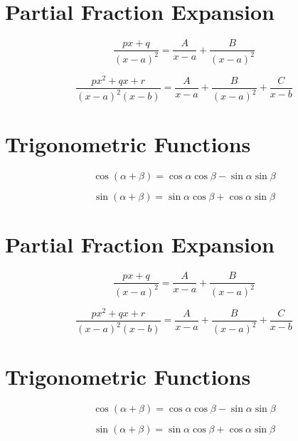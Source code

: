 \documentclass[a4paper,12pt]{article}
\begin{document}
\newpage
\section*{Partial Fraction Expansion}
\begin{equation*}
    \frac{p x + q}{(x - a)^2} = \frac{A}{x - a} + \frac{B}{(x - a)^2}
\end{equation*}

\begin{equation*}
    \frac{p x^2 + q x + r}{(x - a)^2 (x - b)} = \frac{A}{x - a} + \frac{B}{(x - a)^2} + \frac{C}{x - b}
\end{equation*}

\section*{Trigonometric Functions}
\begin{equation*}
    \cos(\alpha + \beta) = \cos \alpha \cos \beta - \sin \alpha \sin \beta
\end{equation*}

\begin{equation*}
    \sin(\alpha + \beta) = \sin \alpha \cos \beta + \cos \alpha \sin \beta
\end{equation*}

\section*{Partial Fraction Expansion}
\begin{equation*}
    \frac{p x + q}{(x - a)^2} = \frac{A}{x - a} + \frac{B}{(x - a)^2}
\end{equation*}

\begin{equation*}
    \frac{p x^2 + q x + r}{(x - a)^2 (x - b)} = \frac{A}{x - a} + \frac{B}{(x - a)^2} + \frac{C}{x - b}
\end{equation*}

\section*{Trigonometric Functions}
\begin{equation*}
    \cos(\alpha + \beta) = \cos \alpha \cos \beta - \sin \alpha \sin \beta
\end{equation*}

\begin{equation*}
    \sin(\alpha + \beta) = \sin \alpha \cos \beta + \cos \alpha \sin \beta
\end{equation*}
\newpage
\end{document}
